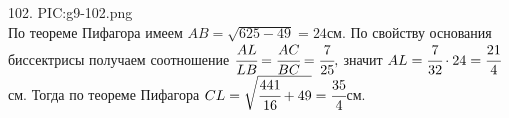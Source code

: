 102. {{PIC:g9-102.png}}\\
По теореме Пифагора имеем $AB=\sqrt{625-49}=24$см. По свойству основания биссектрисы получаем соотношение $\cfrac{AL}{LB}=\cfrac{AC}{BC}=\cfrac{7}{25},$ значит $AL=\cfrac{7}{32}\cdot24=\cfrac{21}{4}$см. Тогда  по теореме Пифагора $CL=\sqrt{\cfrac{441}{16}+49}=\cfrac{35}{4}$см.\newpage\noindent
